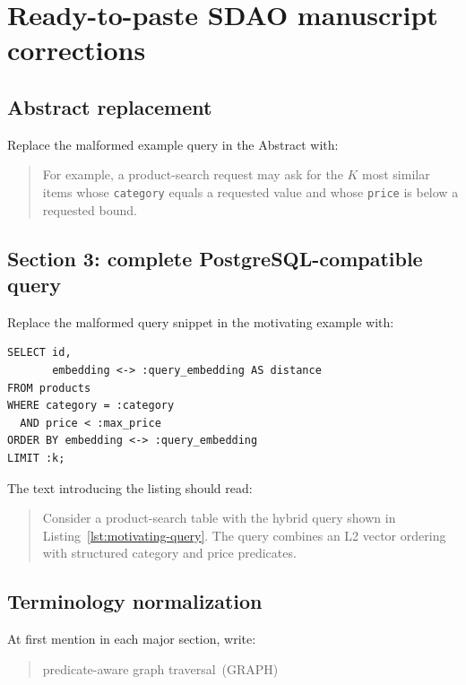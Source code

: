 \documentclass[11pt]{article}
\newcommand{\GRAPH}{\textsc{GRAPH}}
\newcommand{\graphtraversal}{predicate-aware graph traversal}
\begin{document}
\section*{Ready-to-paste SDAO manuscript corrections}

\subsection*{Abstract replacement}

Replace the malformed example query in the Abstract with:

\begin{quote}
For example, a product-search request may ask for the $K$ most similar
items whose \texttt{category} equals a requested value and whose
\texttt{price} is below a requested bound.
\end{quote}

\subsection*{Section 3: complete PostgreSQL-compatible query}

Replace the malformed query snippet in the motivating example with:

\begin{lstlisting}[style=sdao-sql,
caption={Representative PostgreSQL-compatible hybrid SQL--vector query.},
label={lst:motivating-query}]
SELECT id,
       embedding <-> :query_embedding AS distance
FROM products
WHERE category = :category
  AND price < :max_price
ORDER BY embedding <-> :query_embedding
LIMIT :k;
\end{lstlisting}

The text introducing the listing should read:

\begin{quote}
Consider a product-search table with the hybrid query shown in
Listing~\ref{lst:motivating-query}. The query combines an L2 vector
ordering with structured category and price predicates.
\end{quote}

\subsection*{Terminology normalization}

At first mention in each major section, write:

\begin{quote}
\graphtraversal\ (\GRAPH)
\end{quote}
\end{document}
